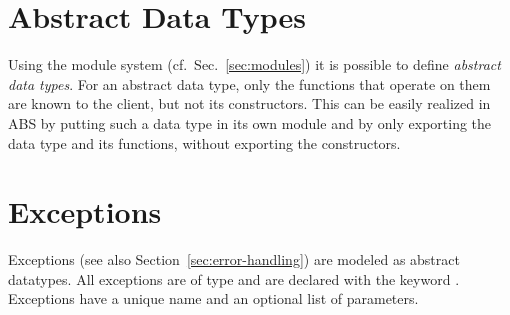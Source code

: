 \section{Abstract Data Types}
\label{sec:abstract data types}
Using the module system (cf.~Sec.~\ref{sec:modules}) it is possible to define \emph{abstract data types}. For an abstract data type, only the functions that operate on them are known to the client, but not its constructors. This can be easily realized in ABS by putting such a data type in its own module and by only exporting the data type and its functions, without exporting the constructors.

\section{Exceptions}
\label{sec:exceptions}

Exceptions (see also Section~\ref{sec:error-handling}) are modeled as abstract
datatypes.  All exceptions are of type  and are
declared with the keyword .  Exceptions have a unique name and
an optional list of parameters.

\begin{abssyntax}
    {}\ \ 
\end{abssyntax}

